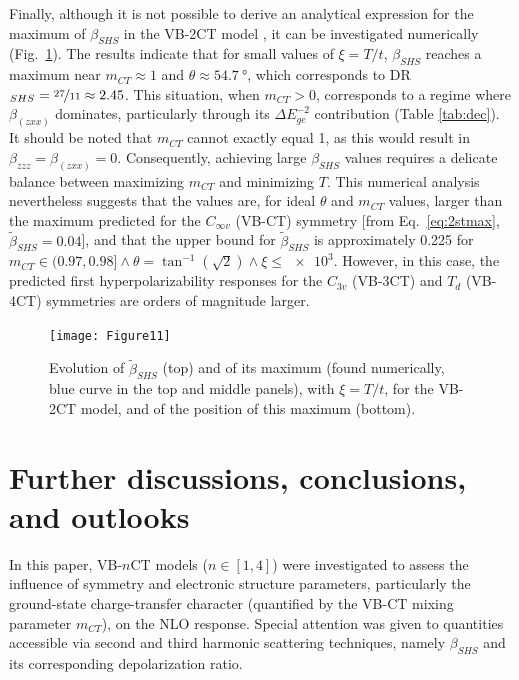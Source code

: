 \documentclass[USenglish]{article}
\begin{document}
Finally, although it is not possible to derive an analytical expression for the maximum of $\beta_{SHS}$ in the VB-2CT model \cite{yangLargeOffDiagonalContribution2003}, it can be investigated numerically (Fig.~\ref{fig:3stmax}). The results indicate that for small values of $\xi = T/t$, $\beta_{SHS}$ reaches a maximum near $m_{CT} \approx 1$ and $\theta \approx \SI{54.7}{\degree}$, which corresponds to DR$_{SHS}=\nicefrac{27}{11}\approx 2.45$. This situation, when $m_{CT} > 0$, corresponds to a regime where $\beta_{(zxx)}$ dominates, particularly through its $\Delta E_{ge}^{-2}$ contribution (Table \ref{tab:dec}). It should be noted that $m_{CT}$ cannot exactly equal 1, as this would result in $\beta_{zzz} = \beta_{(zxx)} = 0$. Consequently, achieving large $\beta_{SHS}$ values requires a delicate balance between maximizing $m_{CT}$ and minimizing $T$. This numerical analysis nevertheless suggests that the values are, for ideal $\theta$ and $m_{CT}$ values, larger than the maximum predicted for the $C_{\infty v}$ (VB-CT) symmetry [from Eq.~\eqref{eq:2stmax}, $\tilde\beta_{SHS}=0.04$], and that the upper bound for $\tilde\beta_{SHS}$ is approximately 0.225 for $m_{CT}\in(0.97,0.98]\land \theta = \tan^{-1}(\sqrt{2}) \land \xi \leq \num{e3}$. However, in this case, the predicted first hyperpolarizability responses for the $C_{3v}$ (VB-3CT) and $T_d$  (VB-4CT) symmetries are orders of magnitude larger.

\begin{figure}[!h]
	\texttt{[image: Figure11]}
	\caption{Evolution of $\tilde\beta_{SHS}$ (top) and of its maximum (found numerically, blue curve in the top and middle panels), with $\xi = T/t$, for the VB-2CT model, and of the position of this maximum (bottom).}
	\label{fig:3stmax}
\end{figure}

\clearpage

\section{Further discussions, conclusions, and outlooks}

In this paper, VB-$n$CT models ($n \in [1,4]$) were investigated to assess the influence of symmetry and electronic structure parameters, particularly the ground-state charge-transfer character (quantified by the VB-CT mixing parameter $m_{CT}$), on the NLO response. Special attention was given to quantities accessible via second and third harmonic scattering techniques, namely $\beta_{SHS}$ and its corresponding depolarization ratio.
\end{document}
